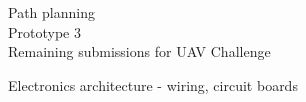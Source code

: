 Path planning\\

Prototype 3\\

Remaining submissions for UAV Challenge\\


Electronics architecture - wiring, circuit boards\\